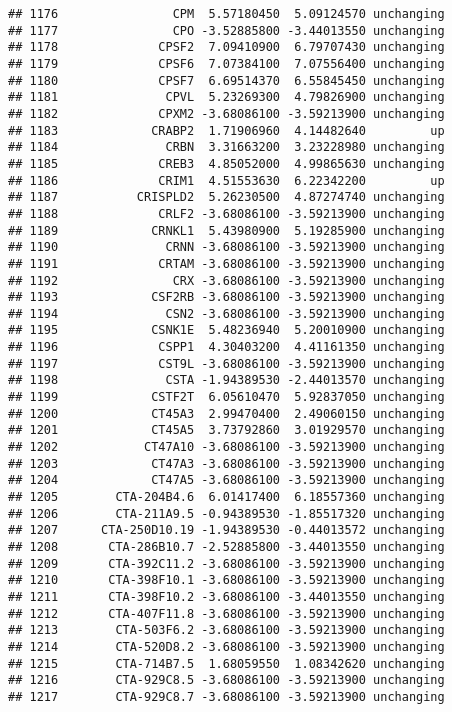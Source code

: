 \documentclass[]{article}
\begin{document}
\begin{verbatim}
## 1176                CPM  5.57180450  5.09124570 unchanging
## 1177                CPO -3.52885800 -3.44013550 unchanging
## 1178              CPSF2  7.09410900  6.79707430 unchanging
## 1179              CPSF6  7.07384100  7.07556400 unchanging
## 1180              CPSF7  6.69514370  6.55845450 unchanging
## 1181               CPVL  5.23269300  4.79826900 unchanging
## 1182              CPXM2 -3.68086100 -3.59213900 unchanging
## 1183             CRABP2  1.71906960  4.14482640         up
## 1184               CRBN  3.31663200  3.23228980 unchanging
## 1185              CREB3  4.85052000  4.99865630 unchanging
## 1186              CRIM1  4.51553630  6.22342200         up
## 1187           CRISPLD2  5.26230500  4.87274740 unchanging
## 1188              CRLF2 -3.68086100 -3.59213900 unchanging
## 1189             CRNKL1  5.43980900  5.19285900 unchanging
## 1190               CRNN -3.68086100 -3.59213900 unchanging
## 1191              CRTAM -3.68086100 -3.59213900 unchanging
## 1192                CRX -3.68086100 -3.59213900 unchanging
## 1193             CSF2RB -3.68086100 -3.59213900 unchanging
## 1194               CSN2 -3.68086100 -3.59213900 unchanging
## 1195             CSNK1E  5.48236940  5.20010900 unchanging
## 1196              CSPP1  4.30403200  4.41161350 unchanging
## 1197              CST9L -3.68086100 -3.59213900 unchanging
## 1198               CSTA -1.94389530 -2.44013570 unchanging
## 1199             CSTF2T  6.05610470  5.92837050 unchanging
## 1200             CT45A3  2.99470400  2.49060150 unchanging
## 1201             CT45A5  3.73792860  3.01929570 unchanging
## 1202            CT47A10 -3.68086100 -3.59213900 unchanging
## 1203             CT47A3 -3.68086100 -3.59213900 unchanging
## 1204             CT47A5 -3.68086100 -3.59213900 unchanging
## 1205        CTA-204B4.6  6.01417400  6.18557360 unchanging
## 1206        CTA-211A9.5 -0.94389530 -1.85517320 unchanging
## 1207      CTA-250D10.19 -1.94389530 -0.44013572 unchanging
## 1208       CTA-286B10.7 -2.52885800 -3.44013550 unchanging
## 1209       CTA-392C11.2 -3.68086100 -3.59213900 unchanging
## 1210       CTA-398F10.1 -3.68086100 -3.59213900 unchanging
## 1211       CTA-398F10.2 -3.68086100 -3.44013550 unchanging
## 1212       CTA-407F11.8 -3.68086100 -3.59213900 unchanging
## 1213        CTA-503F6.2 -3.68086100 -3.59213900 unchanging
## 1214        CTA-520D8.2 -3.68086100 -3.59213900 unchanging
## 1215        CTA-714B7.5  1.68059550  1.08342620 unchanging
## 1216        CTA-929C8.5 -3.68086100 -3.59213900 unchanging
## 1217        CTA-929C8.7 -3.68086100 -3.59213900 unchanging

\end{verbatim}
\end{document}
